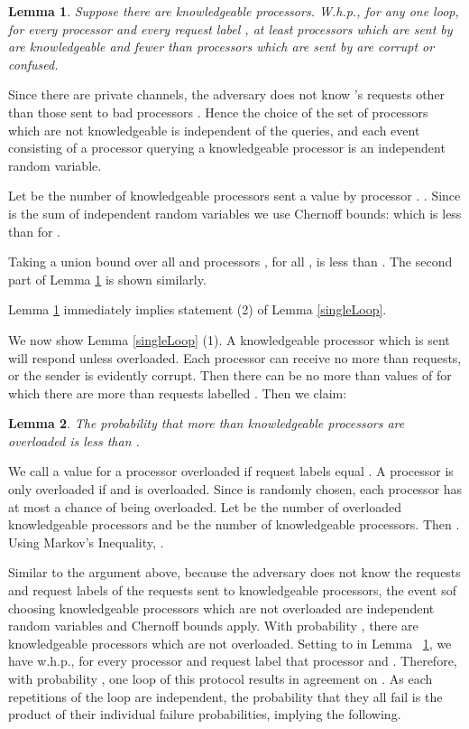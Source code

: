 \documentclass[letterpaper,11pt]{article}
\newtheorem{lemma}{Lemma}
\newcommand{\sq}{\hbox{\rlap{}}}
\newcommand{\qed}{\hspace*{\fill}\sq}
\newenvironment{proof}{\noindent {\bf Proof:}}{\qed\par\vskip 4mm\par}
\begin{document}
 \begin{lemma} \label{requests} Suppose there are  knowledgeable processors.  W.h.p., for any one loop, for every processor  and every request label ,
 at least  processors which are sent  by  are knowledgeable and fewer than  processors which are sent   by  are corrupt or confused.
 
 \end{lemma}
 \begin{proof}
 Since there are private channels, the adversary does not know 's requests other than those sent to bad processors .  Hence the choice of the set  of processors which are not knowledgeable is independent of the queries,  and each  event  consisting of a processor querying a knowledgeable processor is an independent random variable. 
 
 Let  be the number of knowledgeable processors sent a value  by processor . .
 Since  is the sum of independent random variables we use
 Chernoff bounds:   which is less than 
  for .
 
Taking a union bound over all  and  processors ,  for all ,  
is less than . The second part of Lemma \ref{requests} is shown similarly.
\end{proof}

Lemma \ref{requests} immediately implies statement (2) of Lemma \ref{singleLoop}.


We now show Lemma \ref{singleLoop} (1). A knowledgeable processor  which is sent  will respond unless overloaded. Each processor can receive no more than  requests, or the sender is evidently corrupt.
Then there can be no more than   values of   for which there are more than   requests labelled . Then we claim:

 
 \begin{lemma}\label{overload}
The probability that more than  knowledgeable processors are overloaded is less than .
\end{lemma}

\begin{proof} 
We call a value  for a processor overloaded if  request labels equal .
A processor is only overloaded if  and  is overloaded.  Since  is randomly chosen, each processor has 
at most a  chance of being overloaded.  Let  be the number of overloaded knowledgeable processors and
 be the number of knowledgeable processors.
Then . Using Markov's Inequality, . 
\end{proof}
Similar to the argument above, because the adversary does not know the requests and request labels of the requests 
sent to knowledgeable processors, the event sof choosing knowledgeable  processors which are not overloaded are independent random variables and Chernoff bounds apply. With probability , there are  knowledgeable processors which are not overloaded.
Setting  to  in Lemma~ \ref{requests},  we  have w.h.p., for every processor and request label  that  processor
and .  Therefore, with probability , one loop of this protocol results in agreement on .   As each repetitions of the loop are independent, the probability that they all fail is the product of their individual failure
probabilities, implying the following.
 
\end{document}
